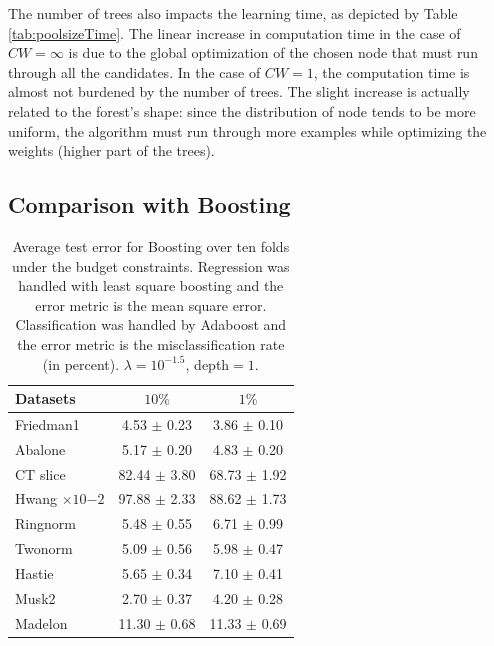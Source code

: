 \documentclass{article}
\begin{document}
The number of trees also impacts the learning time, as depicted by Table 
\ref{tab:poolsizeTime}. The linear increase in computation time in the case of 
$CW=\infty$ is due to the global optimization of the chosen node that must run 
through all the candidates. In the case of $CW=1$, the computation time is 
almost not burdened by the number of trees. The slight increase is actually 
related to the forest's shape: since the distribution of node tends to be more 
uniform, the algorithm must run through more examples while optimizing the 
weights (higher part of the trees).


\subsection{Comparison with Boosting}
\label{subsec:boosting}


\begin{table}[t]
\caption{Average test error for Boosting over ten folds under the budget 
constraints. Regression was handled with least square boosting and the error 
metric is the mean square error. Classification was handled by Adaboost and the 
error metric is the misclassification rate (in percent). $\lambda=10^{-1.5}$, 
depth$=1$.}
\label{tab:boosting}
\begin{center}
\begin{small}
\begin{sc}
\begin{tabular}{l|c|c}
\hline
Datasets & $10\%$ & $1\%$ \\
\hline
Friedman1 & 4.53 $\pm$ 0.23 & 3.86 $\pm$ 0.10 \\
Abalone & 5.17 $\pm$ 0.20 & 4.83 $\pm$ 0.20 \\
CT slice & 82.44 $\pm$ 3.80 & 68.73 $\pm$ 1.92 \\
Hwang $\times 10{-2}$ & 97.88 $\pm$ 2.33 &  88.62 $\pm$ 1.73 \\
\hline
Ringnorm & 5.48 $\pm$ 0.55 & 6.71 $\pm$ 0.99 \\
Twonorm & 5.09 $\pm$ 0.56 & 5.98 $\pm$ 0.47 \\
Hastie & 5.65 $\pm$ 0.34 & 7.10 $\pm$ 0.41 \\
Musk2 & 2.70 $\pm$ 0.37 & 4.20 $\pm$ 0.28 \\
Madelon & 11.30 $\pm$ 0.68 & 11.33 $\pm$ 0.69 \\
\hline
\end{tabular}
\end{sc}
\end{small}
\end{center}
\vskip -0.1in
\end{table}
\end{document}
